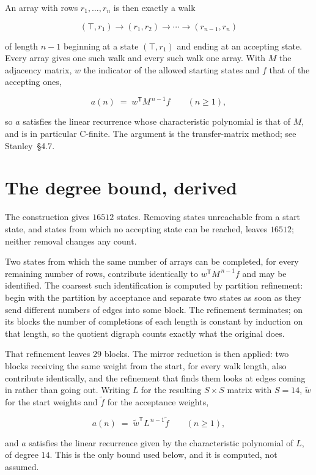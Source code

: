 \documentclass[11pt]{article}
\theoremstyle{definition}
\begin{document}
An array with rows $r_1,\dots,r_n$ is then exactly a walk

\[(\top,r_1) \to (r_1,r_2) \to \cdots \to (r_{n-1},r_n)\]

of length $n-1$ beginning at a state $(\top,r_1)$ and ending at an accepting state. Every array gives one such walk and every such walk one array. With $M$ the adjacency matrix, $w$ the indicator of the allowed starting states and $f$ that of the accepting ones,

\[a(n) \;=\; w^{\mathsf T} M^{\,n-1} f \qquad (n \ge 1),\]

so $a$ satisfies the linear recurrence whose characteristic polynomial is that of $M$, and is in particular C-finite. The argument is the transfer-matrix method; see Stanley~\S4.7.

\section{The degree bound, derived}

The construction gives $16512$ states. Removing states unreachable from a start state, and states from which no accepting state can be reached, leaves $16512$; neither removal changes any count.

Two states from which the same number of arrays can be completed, for every remaining number of rows, contribute identically to $w^{\mathsf T}M^{\,n-1}f$ and may be identified. The coarsest such identification is computed by partition refinement: begin with the partition by acceptance and separate two states as soon as they send different numbers of edges into some block. The refinement terminates; on its blocks the number of completions of each length is constant by induction on that length, so the quotient digraph counts exactly what the original does.

That refinement leaves $29$ blocks. The mirror reduction is then applied: two blocks receiving the same weight from the start, for every walk length, also contribute identically, and the refinement that finds them looks at edges coming in rather than going out. Writing $L$ for the resulting $S \times S$ matrix with $S = 14$, $\tilde w$ for the start weights and $\tilde f$ for the acceptance weights,

\[a(n) \;=\; \tilde w^{\mathsf T} L^{\,n-1} \tilde f \qquad (n \ge 1),\]

and $a$ satisfies the linear recurrence given by the characteristic polynomial of $L$, of degree $14$. This is the only bound used below, and it is computed, not assumed.
\end{document}

